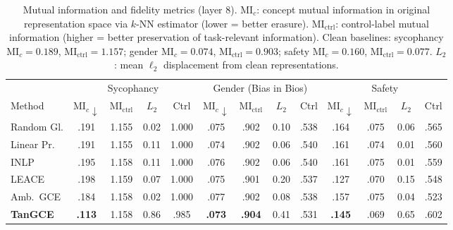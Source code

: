 \begin{table}[t]
\centering
\caption{Mutual information and fidelity metrics (layer 8). MI$_c$: concept mutual information in original representation space via $k$-NN estimator (lower = better erasure). MI$_\text{ctrl}$: control-label mutual information (higher = better preservation of task-relevant information). Clean baselines: sycophancy MI$_c{=}0.189$, MI$_\text{ctrl}{=}1.157$; gender MI$_c{=}0.074$, MI$_\text{ctrl}{=}0.903$; safety MI$_c{=}0.160$, MI$_\text{ctrl}{=}0.077$. $L_2$: mean $\ell_2$ displacement from clean representations.}
\label{tab:full_comparison_detail}
\small
\setlength{\tabcolsep}{3pt}
\begin{tabular}{l|cccc|cccc|cccc}
\toprule
 & \multicolumn{4}{c|}{Sycophancy} & \multicolumn{4}{c|}{Gender (Bias in Bios)} & \multicolumn{4}{c}{Safety} \\
Method & MI$_c\!\downarrow$ & MI$_\text{ctrl}$ & $L_2$ & Ctrl & MI$_c\!\downarrow$ & MI$_\text{ctrl}$ & $L_2$ & Ctrl & MI$_c\!\downarrow$ & MI$_\text{ctrl}$ & $L_2$ & Ctrl \\
\midrule
Random Gl.    & .191 & 1.155 & 0.02 & 1.000 & .075 & .902 & 0.10 & .538 & .164 & .075 & 0.06 & .565 \\
Linear Pr.    & .191 & 1.155 & 0.11 & 1.000 & .074 & .902 & 0.06 & .540 & .161 & .074 & 0.01 & .560 \\
INLP          & .195 & 1.158 & 0.11 & 1.000 & .076 & .902 & 0.06 & .540 & .161 & .075 & 0.01 & .559 \\
LEACE         & .198 & 1.159 & 0.07 & 1.000 & .075 & .901 & 0.20 & .537 & .127 & .070 & 0.15 & .548 \\
Amb.~GCE      & .184 & 1.158 & 0.02 & 1.000 & .077 & .902 & 0.08 & .538 & .157 & .075 & 0.04 & .523 \\
\textbf{TanGCE} & \textbf{.113} & 1.158 & 0.86 & .985 & \textbf{.073} & \textbf{.904} & 0.41 & .531 & \textbf{.145} & .069 & 0.65 & .602 \\
\bottomrule
\end{tabular}
\end{table}
